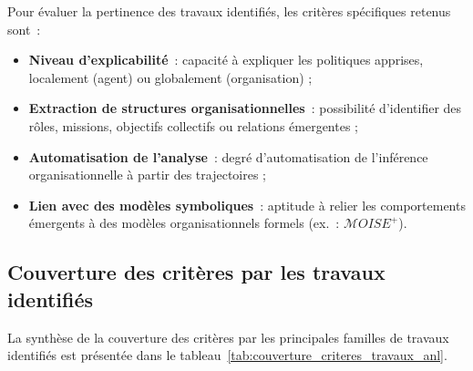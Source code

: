 Pour évaluer la pertinence des travaux identifiés, les critères spécifiques retenus sont~:
\begin{itemize}
  \item \textbf{Niveau d’explicabilité}~: capacité à expliquer les politiques apprises, localement (agent) ou globalement (organisation) ;
  \item \textbf{Extraction de structures organisationnelles}~: possibilité d’identifier des rôles, missions, objectifs collectifs ou relations émergentes ;
  \item \textbf{Automatisation de l’analyse}~: degré d’automatisation de l’inférence organisationnelle à partir des trajectoires ;
  \item \textbf{Lien avec des modèles symboliques}~: aptitude à relier les comportements émergents à des modèles organisationnels formels (ex.~: $\mathcal{M}OISE^+$).
\end{itemize}

\subsection*{Couverture des critères par les travaux identifiés}

La synthèse de la couverture des critères par les principales familles de travaux identifiés est présentée dans le tableau~\ref{tab:couverture_criteres_travaux_anl}.

